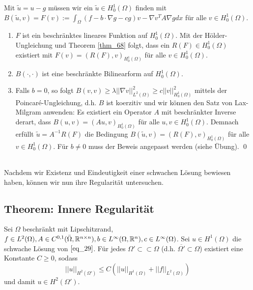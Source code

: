 	Mit $\tilde{u} = u-g$ müssen wir ein $\tilde{u} \in H_0^1(\Omega)$ finden mit $B(\tilde{u},v) = F(v) := \int_{\Omega} (f-b\cdot \nabla g - cg)v - \nabla v^T A \nabla g dx$ für alle $v \in H_0^1(\Omega)$.
	\begin{enumerate}[1.]
		\item $F$ ist ein beschränktes lineares Funktion auf $H_0^1(\Omega)$. Mit der Hölder-Ungleichung und Theorem \eqref{thm_68} folgt, dass ein $R(F) \in H_0^1(\Omega)$ existiert mit $F(v) = (R(F),v)_{H_0^1(\Omega)}$ für alle $v \in H_0^1(\Omega)$.
		\item $B(\cdot,\cdot)$ ist eine beschränkte Bilinearform auf $H_0^1(\Omega)$.
		\item Falls $b = 0$, so folgt $B(v,v) \geq \lambda ||\nabla v||_{L^2(\Omega)}^2 \geq c ||v||_{H_0^1(\Omega)}^2$ mittels der Poincaré-Ungleichung, d.h. $B$ ist koerzitiv und wir können den Satz von Lax-Milgram anwenden: Es existiert ein Operator $A$ mit beschränkter Inverse derart, dass $B(u,v) = (Au,v)_{H_0^1(\Omega)}$ für alle $u,v \in H_0^1(\Omega)$. Demnach erfüllt $\tilde{u} = A^{-1} R(F)$ die Bedingung $B(\tilde{u},v) = (R(F),v)_{H_0^1(\Omega)}$ für alle $v \in H_0^1(\Omega)$. Für $b \neq 0$ muss der Beweis angepasst werden (siehe Übung). \qed
	\end{enumerate}

\mbox{} \\
Nachdem wir Existenz und Eindeutigkeit einer schwachen Lösung bewiesen haben, können wir nun ihre Regularität untersuchen.

\subsection{Theorem: Innere Regularität}
\label{thm_72}
	Sei $\Omega$ beschränkt mit Lipschitzrand,\marginnote{[72]} $f \in L^2(\Omega), A \in C^{0,1}(\bar{\Omega},\mathbb{R}^{n \times n}), b \in L^\infty(\Omega,\mathbb{R}^n), c \in L^\infty(\Omega)$. Sei $u \in H^1(\Omega)$ die schwache Lösung von $\eqref{eq_29}$. Für jedes $\Omega' \subset \subset \Omega$ (d.h. $\overline{\Omega'} \subset \Omega$) existiert eine Konstante $C \geq 0$, sodass
	\[ ||u||_{H^2(\Omega')} \leq C(||u||_{H^1(\Omega)} + ||f||_{L^2(\Omega)}) \]
	und damit $u \in H^2(\Omega')$.

